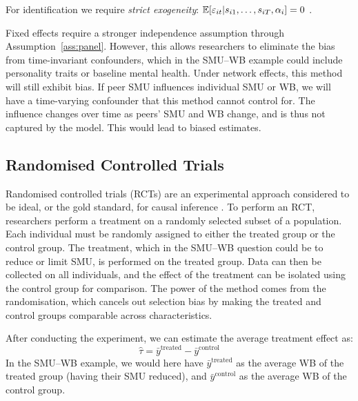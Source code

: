 \begin{assumption}
    \label{ass:panel}
    For identification we require \emph{strict exogeneity}: $\mathbb{E}[\varepsilon_{it} | s_{i1}, \ldots, s_{iT}, \alpha_i] = 0$ \parencite[Sec.~10.2.2]{Wooldridge2010}.
\end{assumption}

Fixed effects require a stronger independence assumption through Assumption~\ref{ass:panel}. However, this allows researchers to eliminate the bias from time-invariant confounders, which in the SMU--WB example could include personality traits or baseline mental health. Under network effects, this method will still exhibit bias. If peer SMU influences individual SMU or WB, we will have a time-varying confounder that this method cannot control for. The influence changes over time as peers' SMU and WB change, and is thus not captured by the model. This would lead to biased estimates.

\subsection{Randomised Controlled Trials}
\label{sec:intro:rct}
Randomised controlled trials (RCTs) are an experimental approach considered to be ideal, or the gold standard, for causal inference \parencite[Ch.~2]{Angrist2009}. To perform an RCT, researchers perform a treatment on a randomly selected subset of a population. Each individual must be randomly assigned to either the treated group or the control group. The treatment, which in the SMU--WB question could be to reduce or limit SMU, is performed on the treated group. Data can then be collected on all individuals, and the effect of the treatment can be isolated using the control group for comparison. The power of the method comes from the randomisation, which cancels out selection bias by making the treated and control groups comparable across characteristics.

After conducting the experiment, we can estimate the average treatment effect as:
\begin{equation}
    \hat{\tau} = \bar{y}^{\text{treated}} - \bar{y}^{\text{control}}
\end{equation}
In the SMU--WB example, we would here have $\bar{y}^{\text{treated}}$ as the average WB of the treated group (having their SMU reduced), and $\bar{y}^{\text{control}}$ as the average WB of the control group.

